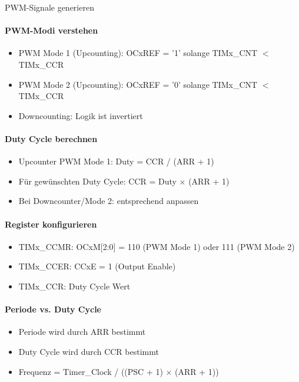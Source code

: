 \begin{KR}{PWM-Signale generieren}\\
    \paragraph{PWM-Modi verstehen}
    \begin{itemize}
        \item PWM Mode 1 (Upcounting): OCxREF = '1' solange TIMx\_CNT $<$ TIMx\_CCR
        \item PWM Mode 2 (Upcounting): OCxREF = '0' solange TIMx\_CNT $<$ TIMx\_CCR
        \item Downcounting: Logik ist invertiert
    \end{itemize}
    
    \paragraph{Duty Cycle berechnen}
    \begin{itemize}
        \item Upcounter PWM Mode 1: Duty = CCR / (ARR + 1)
        \item Für gewünschten Duty Cycle: CCR = Duty $\times$ (ARR + 1)
        \item Bei Downcounter/Mode 2: entsprechend anpassen
    \end{itemize}
    
    \paragraph{Register konfigurieren}
    \begin{itemize}
        \item TIMx\_CCMR: OCxM[2:0] = 110 (PWM Mode 1) oder 111 (PWM Mode 2)
        \item TIMx\_CCER: CCxE = 1 (Output Enable)
        \item TIMx\_CCR: Duty Cycle Wert
    \end{itemize}
    
    \paragraph{Periode vs. Duty Cycle}
    \begin{itemize}
        \item Periode wird durch ARR bestimmt
        \item Duty Cycle wird durch CCR bestimmt
        \item Frequenz = Timer\_Clock / ((PSC + 1) $\times$ (ARR + 1))
    \end{itemize}
\end{KR}

